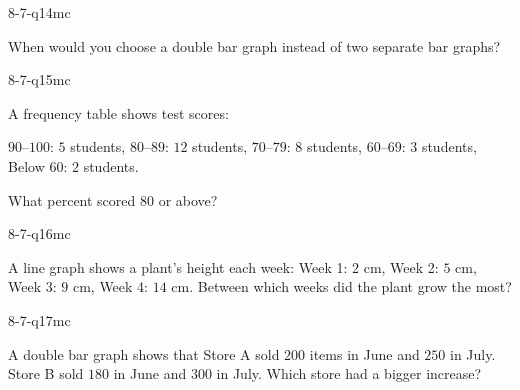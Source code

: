 \begin{practiceQuestion}{8-7-q14}{mc}
\begin{questionText}
When would you choose a double bar graph instead of two separate bar graphs?
\end{questionText}
\end{practiceQuestion}

\begin{practiceQuestion}{8-7-q15}{mc}
\begin{questionText}
A frequency table shows test scores:

$90$--$100$: $5$ students, $80$--$89$: $12$ students, $70$--$79$: $8$ students, $60$--$69$: $3$ students, Below $60$: $2$ students.

What percent scored $80$ or above?
\end{questionText}
\end{practiceQuestion}

\begin{practiceQuestion}{8-7-q16}{mc}
\begin{questionText}
A line graph shows a plant's height each week: Week 1: $2$ cm, Week 2: $5$ cm, Week 3: $9$ cm, Week 4: $14$ cm. Between which weeks did the plant grow the most?
\end{questionText}
\end{practiceQuestion}

\begin{practiceQuestion}{8-7-q17}{mc}
\begin{questionText}
A double bar graph shows that Store A sold $200$ items in June and $250$ in July. Store B sold $180$ in June and $300$ in July. Which store had a bigger increase?
\end{questionText}
\end{practiceQuestion}

